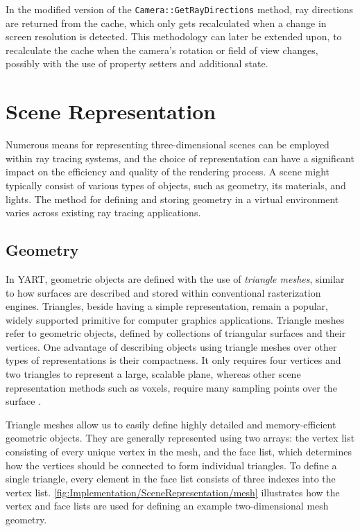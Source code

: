 In the modified version of the \verb|Camera::GetRayDirections| method, ray directions are returned from the cache, which only gets recalculated when a change in screen resolution is detected.
This methodology can later be extended upon, to recalculate the cache when the camera's rotation or field of view changes, possibly with the use of property setters and additional state.  

\section{Scene Representation}

Numerous means for representing three-dimensional scenes can be employed within ray tracing systems, and the choice of representation can have a significant impact on the efficiency and quality of the rendering process.  
A scene might typically consist of various types of objects, such as geometry, its materials, and lights. 
The method for defining and storing geometry in a virtual environment varies across existing ray tracing applications.

\subsection{Geometry}

In YART, geometric objects are defined with the use of \textit{triangle meshes}, similar to how surfaces are described and stored within conventional rasterization engines.
Triangles, beside having a simple representation, remain a popular, widely supported primitive for computer graphics applications. 
Triangle meshes refer to geometric objects, defined by collections of triangular surfaces and their vertices.
One advantage of describing objects using triangle meshes over other types of representations is their compactness.
It only requires four vertices and two triangles to represent a large, scalable plane, whereas other scene representation methods such as voxels, require many sampling points over the surface \supercite{Kato2018}.

\clearpage

Triangle meshes allow us to easily define highly detailed and memory-efficient geometric objects. 
They are generally represented using two arrays: the vertex list consisting of every unique vertex in the mesh, and the face list, which determines how the vertices should be connected to form individual triangles. 
To define a single triangle, every element in the face list consists of three indexes into the vertex list.
\cref{fig:Implementation/SceneRepresentation/mesh} illustrates how the vertex and face lists are used for defining an example two-dimensional mesh geometry.

